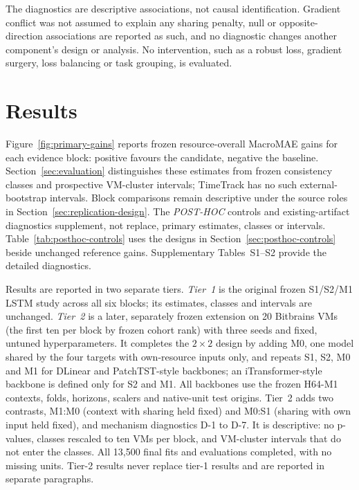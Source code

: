 \documentclass[a4paper,fleqn]{cas-dc}
\begin{document}
The diagnostics are descriptive associations, not causal identification.
Gradient conflict was not assumed to explain any sharing penalty, null or
opposite-direction associations are reported as such, and no diagnostic
changes another component's design or analysis. No intervention, such as a
robust loss, gradient surgery, loss balancing or task grouping, is evaluated.

\section{Results}

Figure~\ref{fig:primary-gains} reports frozen resource-overall MacroMAE gains
for each evidence block: positive favours the candidate, negative the baseline.
Section~\ref{sec:evaluation} distinguishes these estimates from frozen
consistency classes and prospective VM-cluster intervals; TimeTrack has no
such external-bootstrap intervals. Block comparisons remain descriptive under
the source roles in Section~\ref{sec:replication-design}.
The \emph{POST-HOC} controls and existing-artifact diagnostics supplement,
not replace, primary estimates, classes or intervals.
Table~\ref{tab:posthoc-controls} uses the designs in
Section~\ref{sec:posthoc-controls} beside unchanged reference gains.
Supplementary Tables~S1--S2 provide the detailed diagnostics.

Results are reported in two separate tiers. \emph{Tier~1} is the original
frozen S1/S2/M1 LSTM study across all six blocks; its estimates, classes and
intervals are unchanged. \emph{Tier~2} is a later, separately frozen
extension on 20 Bitbrains VMs (the first ten per block by frozen cohort rank)
with three seeds and fixed, untuned hyperparameters. It completes the
$2\times2$ design by adding M0, one model shared by the four targets with
own-resource inputs only, and repeats S1, S2, M0 and M1 for DLinear and
PatchTST-style backbones; an iTransformer-style backbone is defined only for
S2 and M1. All backbones use the frozen H64-M1 contexts, folds, horizons,
scalers and native-unit test origins. Tier~2 adds two contrasts,
M1:M0 (context with sharing held fixed) and M0:S1 (sharing with own input
held fixed), and mechanism diagnostics D-1 to D-7. It is descriptive: no
p-values, classes rescaled to ten VMs per block, and VM-cluster intervals
that do not enter the classes. All 13{,}500 final fits and evaluations
completed, with no missing units. Tier-2 results never replace tier-1
results and are reported in separate paragraphs.
\end{document}
